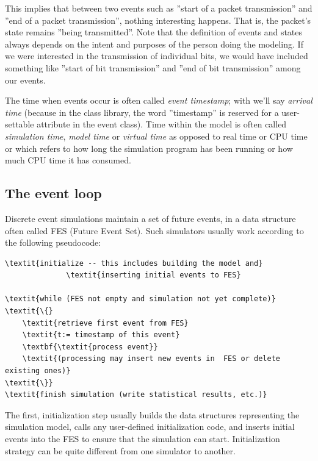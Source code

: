 This implies that between two events such as ''start of a packet
transmission'' and ''end of a packet transmission'', nothing
interesting happens. That is, the packet's state remains ''being
transmitted''. Note that the definition of events and states always
depends on the intent and purposes of the person doing the modeling.
If we were interested in the transmission of individual bits, we would
have included something like ''start of bit transmission'' and ''end
of bit transmission'' among our events.


The time when events occur is often called \textit{event
  timestamp}; with {\opp} we'll say
\textit{arrival time} (because in the class
library, the word ''timestamp'' is reserved for a user-settable
attribute in the event class). Time within the model is often called
\textit{simulation time}, \textit{model
  time} or \textit{virtual time}
as opposed to real time or CPU time
or which refers to how long the simulation program has been running or
how much CPU time it has consumed.





\subsection{The event loop}

Discrete event simulations maintain a set of future
events, in a data structure often called
FES (Future Event Set). Such simulators usually work
according to the following pseudocode:

\begin{Verbatim}[commandchars=\\\{\}]
\textit{initialize -- this includes building the model and}
              \textit{inserting initial events to FES}

\textit{while (FES not empty and simulation not yet complete)}
\textit{\{}
    \textit{retrieve first event from FES}
    \textit{t:= timestamp of this event}
    \textbf{\textit{process event}}
    \textit{(processing may insert new events in  FES or delete existing ones)}
\textit{\}}
\textit{finish simulation (write statistical results, etc.)}
\end{Verbatim}


The first, initialization step usually builds the data structures
representing the simulation model, calls any user-defined
initialization code, and inserts initial events
into the FES to ensure that the simulation can start. Initialization
strategy can be quite different from one simulator to another.


